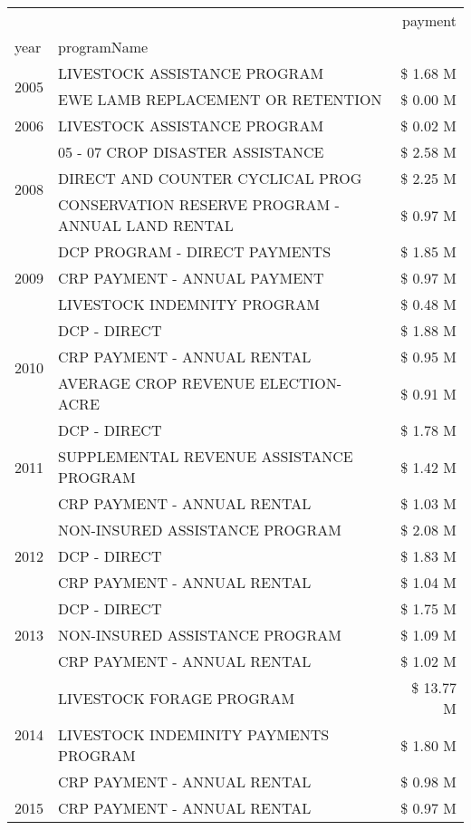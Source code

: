 \begin{tabular}{llr}
\toprule
 &  & payment \\
year & programName &  \\
\midrule
\multirow[t]{2}{*}{2005} & LIVESTOCK ASSISTANCE PROGRAM & \$ 1.68 M \\
 & EWE LAMB REPLACEMENT OR RETENTION & \$ 0.00 M \\
\cline{1-3}
2006 & LIVESTOCK ASSISTANCE PROGRAM & \$ 0.02 M \\
\cline{1-3}
\multirow[t]{3}{*}{2008} & 05 - 07 CROP DISASTER ASSISTANCE & \$ 2.58 M \\
 & DIRECT AND COUNTER CYCLICAL PROG & \$ 2.25 M \\
 & CONSERVATION RESERVE PROGRAM - ANNUAL LAND RENTAL & \$ 0.97 M \\
\cline{1-3}
\multirow[t]{3}{*}{2009} & DCP PROGRAM - DIRECT PAYMENTS & \$ 1.85 M \\
 & CRP PAYMENT - ANNUAL PAYMENT & \$ 0.97 M \\
 & LIVESTOCK INDEMNITY PROGRAM & \$ 0.48 M \\
\cline{1-3}
\multirow[t]{3}{*}{2010} & DCP - DIRECT & \$ 1.88 M \\
 & CRP PAYMENT - ANNUAL RENTAL & \$ 0.95 M \\
 & AVERAGE CROP REVENUE ELECTION-ACRE & \$ 0.91 M \\
\cline{1-3}
\multirow[t]{3}{*}{2011} & DCP - DIRECT & \$ 1.78 M \\
 & SUPPLEMENTAL REVENUE ASSISTANCE PROGRAM & \$ 1.42 M \\
 & CRP PAYMENT - ANNUAL RENTAL & \$ 1.03 M \\
\cline{1-3}
\multirow[t]{3}{*}{2012} & NON-INSURED ASSISTANCE PROGRAM & \$ 2.08 M \\
 & DCP - DIRECT & \$ 1.83 M \\
 & CRP PAYMENT - ANNUAL RENTAL & \$ 1.04 M \\
\cline{1-3}
\multirow[t]{3}{*}{2013} & DCP - DIRECT & \$ 1.75 M \\
 & NON-INSURED ASSISTANCE PROGRAM & \$ 1.09 M \\
 & CRP PAYMENT - ANNUAL RENTAL & \$ 1.02 M \\
\cline{1-3}
\multirow[t]{3}{*}{2014} & LIVESTOCK FORAGE PROGRAM & \$ 13.77 M \\
 & LIVESTOCK INDEMINITY PAYMENTS PROGRAM & \$ 1.80 M \\
 & CRP PAYMENT - ANNUAL RENTAL & \$ 0.98 M \\
\cline{1-3}
\multirow[t]{3}{*}{2015} & CRP PAYMENT - ANNUAL RENTAL & \$ 0.97 M \\

\end{tabular}
